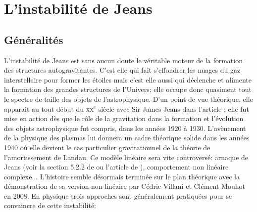 \section{L'instabilité de Jeans}\label{Chap::Instabilite::Sec::Jeans}

\subsection{Généralités}

L'instabilité de Jeans est sans aucun doute le véritable moteur de la formation des structures autogravitantes. C'est elle qui fait s'effondrer les
nuages du gaz interstellaire pour former les étoiles mais c'est elle aussi qui déclenche et alimente la formation des grandes structures de l'Univers;
elle occupe donc quasiment tout le spectre de taille des objets de l'astrophysique. D'un point de vue théorique, elle apparait au tout début du
\textsc{xx}$^e$ siècle avec Sir James Jeans dans l'article \cite{jeans02}; elle fut mise en action dès que le rôle de la gravitation dans la formation
et l'évolution  des objets astrophysique fut compris, dans les années 1920 à 1930. L'avènement de la physique des plasmas lui donnera un
cadre théorique solide dans les années 1940 où elle devient le cas particulier gravitationnel de la théorie de l'amortissement de Landau. Ce modèle
linéaire sera vite controversé: arnaque de Jeans (voir la section 5.2.2 de \cite{2008gady.book.....B}  ou l'article de
\cite{kiessling}), comportement non linéaire complexe... L'histoire semble désormais terminée sur le plan théorique avec la démonstration de sa
version non linéaire par Cédric Villani et Clément Mouhot en 2008. En physique trois approches sont généralement pratiquées pour se convaincre de
cette instabilité:
